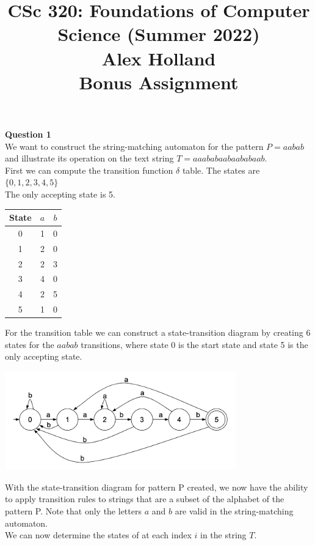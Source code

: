\documentclass{article}
\title{%
   CSc 320: Foundations of Computer Science (Summer 2022)\\
    \Large Alex Holland\\
    Bonus Assignment\\
    }
\date{}
\begin{document}
\maketitle

{\bf Question 1}\\
We want to construct the string-matching automaton for the pattern $P=aabab$ and illustrate its operation on the text string $T=aaababaabaababaab$.\\
First we can compute the transition function $\delta$ table. The states are $\{0,1,2,3,4,5\}$\\
The only accepting state is 5.

\begin{center}
\begin{tabular}{||c c c||} 
 \hline
 State & $a$ & $b$ \\ [0.5ex] 
 \hline\hline
 0 & 1 & 0 \\ 
 \hline
 1 & 2 & 0 \\
 \hline
 2 & 2 & 3 \\
 \hline
 3 & 4 & 0 \\
 \hline
 4 & 2 & 5 \\
 \hline
 5 & 1 & 0 \\
 \hline
\end{tabular}
\end{center}

For the transition table we can construct a state-transition diagram by creating 6 states for the $aabab$ transitions, where state 0 is the start state and state 5 is the only accepting state. 
\begin{center}
    \includegraphics[width=0.75\textwidth]{1.png}
\end{center}

With the state-transition diagram for pattern P created, we now have the ability to apply transition rules to strings that are a subset of the alphabet of the pattern P. Note that only the letters $a$ and $b$ are valid in the string-matching automaton.\\

\break
We can now determine the states of at each index $i$ in the string $T$.
\end{document}
